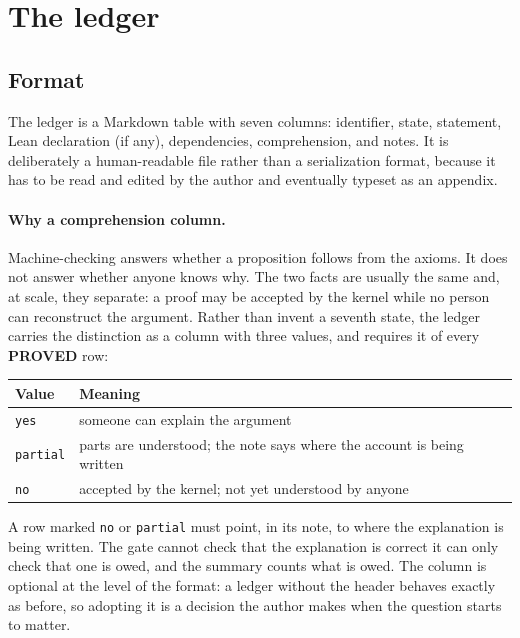 \documentclass[11pt]{article}
\newcommand{\Lean}{Lean}
\newcommand{\claim}[1]{\textbf{#1}}
\newcommand{\code}[1]{\texttt{#1}}
\begin{document}
\section{The ledger}

\subsection{Format}

The ledger is a Markdown table with seven columns: identifier, state,
statement, \Lean{} declaration (if any), dependencies, comprehension, and
notes. It is deliberately a human-readable file rather than a serialization
format, because it has to be read and edited by the author and eventually
typeset as an appendix.

\paragraph{Why a comprehension column.} Machine-checking answers whether a
proposition follows from the axioms. It does not answer whether anyone knows
why. The two facts are usually the same and, at scale, they separate: a proof
may be accepted by the kernel while no person can reconstruct the argument.
Rather than invent a seventh state, the ledger carries the distinction as a
column with three values, and requires it of every \claim{PROVED} row:

\begin{center}
\begin{tabular}{@{}ll@{}}
\toprule
Value & Meaning \\
\midrule
\code{yes} & someone can explain the argument \\
\code{partial} & parts are understood; the note says where the account is
  being written \\
\code{no} & accepted by the kernel; not yet understood by anyone \\
\bottomrule
\end{tabular}
\end{center}

A row marked \code{no} or \code{partial} must point, in its note, to where
the explanation is being written. The gate cannot check that the explanation is
correct \textemdash{} it can only check that one is owed, and the summary
counts what is owed. The column is optional at the level of the format: a
ledger without the header behaves exactly as before, so adopting it is a
decision the author makes when the question starts to matter.
\end{document}
